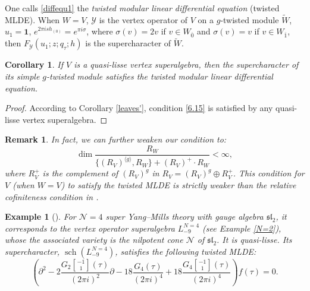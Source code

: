 \documentclass[9pt]{amsart}
\newtheorem{corollary}{Corollary}[section]
\newtheorem{example}{Example}[section]
\newtheorem{remark}{Remark}[section]
\begin{document}
One calls \eqref{diffequ1} the \emph{twisted modular linear differential equation} (twisted MLDE). When $W = V$, $\mathcal{Y}$ is the vertex operator of $V$ on a $g$-twisted module $\tilde{W}$, $u_1 = \mathbf{1}$, 
$e^{2\pi i s h_{(0)}} = e^{\pi i \sigma}$, where $\sigma(v) = 2v$ if $v \in W_{\overline{0}}$ and $\sigma(v) = v$ if $v \in W_{\overline{1}}$, then $F_{\mathcal{Y}}(u_1; z; q_\tau; h)$ is the supercharacter of $\tilde{W}$.

\begin{corollary}\label{twistedmlde}
If $V$ is a quasi-lisse vertex superalgebra, then the supercharacter of its simple $g$-twisted module satisfies the twisted modular linear differential equation.
\end{corollary}

\begin{proof}
According to Corollary \ref{leaves'}, condition \eqref{6.15} is satisfied by any quasi-lisse vertex superalgebra.
\end{proof}

\begin{remark}
In fact, we can further weaken our condition to:
\[
\operatorname{dim} \frac{R_W}{\{ (R_V)^{\langle g \rangle}, R_W \} + (R_V)^+ \cdot R_W} < \infty,
\]
where $R_V^+$ is the complement of $(R_V)^g$ in $R_V = (R_V)^g \oplus R_V^+$. This condition for $V$ (when $W = V$) to satisfy the twisted MLDE is strictly weaker than the relative cofiniteness condition in \cite{arakawa2019modularity}.
\end{remark}

\begin{example}[{\cite{beem2018vertex}}]
For $\mathcal{N} = 4$ super Yang–Mills theory with gauge algebra $\mathfrak{sl}_2$, it corresponds to the vertex operator superalgebra $L_{-9}^{N=4}$ (see Example \ref{N=2}), whose the associated variety is the nilpotent cone $\mathcal{N}$ of $\mathfrak{sl}_2$. It is quasi-lisse. Its supercharacter, $\operatorname{sch}(L_{-9}^{N=4})$, satisfies the following twisted MLDE:
\[
\left( \partial^2 - 2\frac{G_2\genfrac[]{0pt}{0}{-1}{1}(\tau)}{(2\pi i)^2} \partial - 18\frac{G_4(\tau)}{(2\pi i)^4} + 18\frac{G_4\genfrac[]{0pt}{0}{-1}{1}(\tau)}{(2\pi i)^4} \right) f(\tau) = 0.
\]
\end{example}
\end{document}
